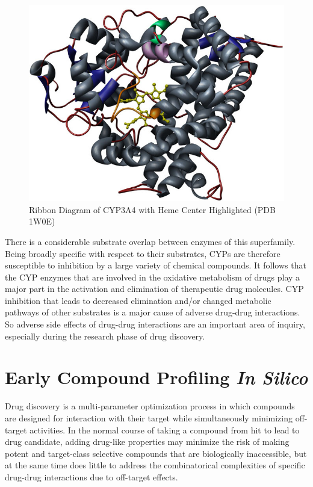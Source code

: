 \begin{figure}[H]
  \centering
   \includegraphics[width=1\textwidth]{../img/CYP3A4_heme.jpg}
  \caption[Ribbon Diagram of CYP3A4 with Heme Center]{Ribbon Diagram of CYP3A4 with Heme Center Highlighted (PDB 1W0E)}
  \label{fig:heme}
\end{figure}

There is a considerable substrate overlap between enzymes of this superfamily. Being broadly specific with respect to their substrates, CYPs are therefore susceptible to inhibition by a large variety of chemical compounds. It follows that the CYP enzymes that are involved in the oxidative metabolism of drugs play a major part in the activation and elimination of therapeutic drug molecules. CYP inhibition that leads to decreased elimination and/or changed metabolic pathways of other substrates is a major cause of adverse drug-drug interactions. \cite{Lapins2013} So adverse side effects of drug-drug interactions are an important area of inquiry, especially during the research phase of drug discovery.


\section{Early Compound Profiling \textit{In Silico}}

Drug discovery is a multi-parameter optimization process in which compounds are designed for interaction with their target while simultaneously minimizing off-target activities. \cite{Zlokarnik2005} In the normal course of taking a compound from hit to lead to drug candidate, adding drug-like properties may minimize the risk of making potent and target-class selective compounds that are biologically inaccessible, but at the same time does little to address the combinatorical complexities of specific drug-drug interactions due to off-target effects.

